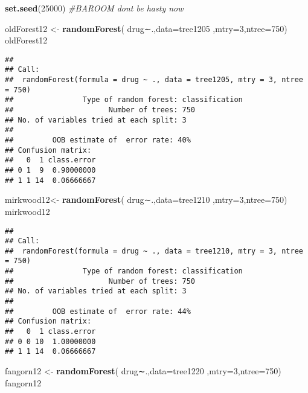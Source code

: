 \documentclass[]{article}
\newenvironment{Shaded}{\begin{snugshade}}{\end{snugshade}}
\newcommand{\KeywordTok}[1]{\textcolor[rgb]{0.13,0.29,0.53}{\textbf{#1}}}
\newcommand{\DataTypeTok}[1]{\textcolor[rgb]{0.13,0.29,0.53}{#1}}
\newcommand{\DecValTok}[1]{\textcolor[rgb]{0.00,0.00,0.81}{#1}}
\newcommand{\StringTok}[1]{\textcolor[rgb]{0.31,0.60,0.02}{#1}}
\newcommand{\CommentTok}[1]{\textcolor[rgb]{0.56,0.35,0.01}{\textit{#1}}}
\newcommand{\NormalTok}[1]{#1}
\begin{document}
\begin{Shaded}
\begin{Highlighting}[]
\KeywordTok{set.seed}\NormalTok{(}\DecValTok{25000}\NormalTok{)}
\CommentTok{#BAROOM dont be hasty now}

\NormalTok{oldForest12 <-}\StringTok{ }\KeywordTok{randomForest}\NormalTok{( drug∼.,}\DataTypeTok{data=}\NormalTok{tree1205  ,}\DataTypeTok{mtry=}\DecValTok{3}\NormalTok{,}\DataTypeTok{ntree=}\DecValTok{750}\NormalTok{)}
\NormalTok{oldForest12}
\end{Highlighting}
\end{Shaded}

\begin{verbatim}
## 
## Call:
##  randomForest(formula = drug ~ ., data = tree1205, mtry = 3, ntree = 750) 
##                Type of random forest: classification
##                      Number of trees: 750
## No. of variables tried at each split: 3
## 
##         OOB estimate of  error rate: 40%
## Confusion matrix:
##   0  1 class.error
## 0 1  9  0.90000000
## 1 1 14  0.06666667
\end{verbatim}

\begin{Shaded}
\begin{Highlighting}[]
\NormalTok{mirkwood12<-}\StringTok{ }\KeywordTok{randomForest}\NormalTok{( drug∼.,}\DataTypeTok{data=}\NormalTok{tree1210  ,}\DataTypeTok{mtry=}\DecValTok{3}\NormalTok{,}\DataTypeTok{ntree=}\DecValTok{750}\NormalTok{)}
\NormalTok{mirkwood12}
\end{Highlighting}
\end{Shaded}

\begin{verbatim}
## 
## Call:
##  randomForest(formula = drug ~ ., data = tree1210, mtry = 3, ntree = 750) 
##                Type of random forest: classification
##                      Number of trees: 750
## No. of variables tried at each split: 3
## 
##         OOB estimate of  error rate: 44%
## Confusion matrix:
##   0  1 class.error
## 0 0 10  1.00000000
## 1 1 14  0.06666667
\end{verbatim}

\begin{Shaded}
\begin{Highlighting}[]
\NormalTok{fangorn12 <-}\StringTok{ }\KeywordTok{randomForest}\NormalTok{( drug∼.,}\DataTypeTok{data=}\NormalTok{tree1220  ,}\DataTypeTok{mtry=}\DecValTok{3}\NormalTok{,}\DataTypeTok{ntree=}\DecValTok{750}\NormalTok{)}
\NormalTok{fangorn12}
\end{Highlighting}
\end{Shaded}
\end{document}
